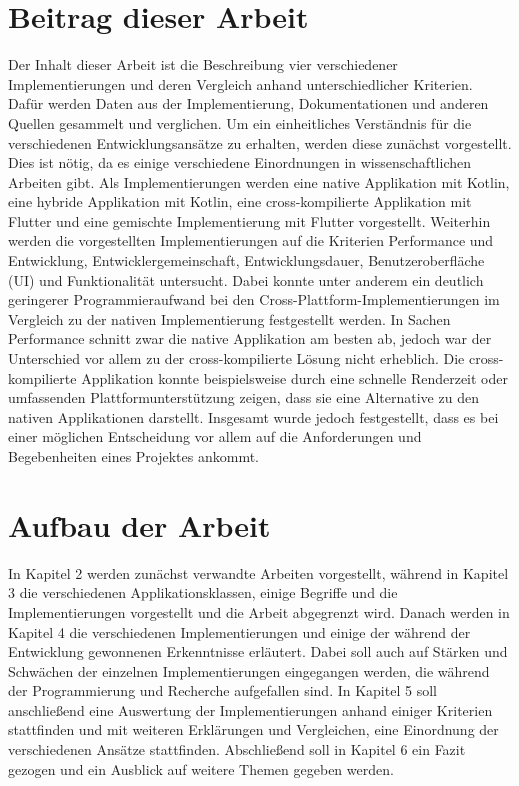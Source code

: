 \section{Beitrag dieser Arbeit}
Der Inhalt dieser Arbeit ist die Beschreibung vier verschiedener Implementierungen und deren Vergleich anhand unterschiedlicher Kriterien. Dafür werden Daten aus der Implementierung, Dokumentationen und anderen Quellen gesammelt und verglichen.
Um ein einheitliches Verständnis für die verschiedenen Entwicklungsansätze zu erhalten, werden diese zunächst vorgestellt. Dies ist nötig, da es einige verschiedene Einordnungen in wissenschaftlichen Arbeiten gibt.
Als Implementierungen werden eine native Applikation mit Kotlin, eine hybride Applikation mit Kotlin, eine cross-kompilierte Applikation mit Flutter und eine gemischte Implementierung mit Flutter vorgestellt. 
Weiterhin werden die vorgestellten Implementierungen auf die Kriterien Performance und Entwicklung, Entwicklergemeinschaft, Entwicklungsdauer, Benutzeroberfläche (UI) und Funktionalität untersucht.
Dabei konnte unter anderem ein deutlich geringerer Programmieraufwand bei den Cross-Plattform-Implementierungen im Vergleich zu der nativen Implementierung festgestellt werden. In Sachen Performance schnitt zwar die native Applikation am besten ab, jedoch war der Unterschied vor allem zu der cross-kompilierte Lösung nicht erheblich. Die cross-kompilierte Applikation konnte beispielsweise durch eine schnelle Renderzeit oder umfassenden Plattformunterstützung zeigen, dass sie eine Alternative zu den nativen Applikationen darstellt. Insgesamt wurde jedoch festgestellt, dass es bei einer möglichen Entscheidung vor allem auf die Anforderungen und Begebenheiten eines Projektes ankommt.

\section{Aufbau der Arbeit}
In Kapitel 2 werden zunächst verwandte Arbeiten vorgestellt, während in Kapitel 3 die verschiedenen Applikationsklassen, einige Begriffe und die Implementierungen vorgestellt und die Arbeit abgegrenzt wird.
Danach werden in Kapitel 4 die verschiedenen Implementierungen und einige der während der Entwicklung gewonnenen Erkenntnisse erläutert. Dabei soll auch auf Stärken und Schwächen der einzelnen Implementierungen eingegangen werden, die während der Programmierung und Recherche aufgefallen sind.
In Kapitel 5 soll anschließend eine Auswertung der Implementierungen anhand einiger Kriterien stattfinden und mit weiteren Erklärungen und Vergleichen, eine Einordnung der verschiedenen Ansätze stattfinden. Abschließend soll in Kapitel 6 ein Fazit gezogen und ein Ausblick auf weitere Themen gegeben werden.